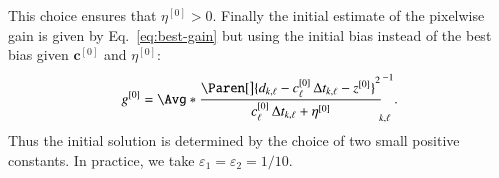 \documentclass{aa}
\newcommand*{\V}[1]{\boldsymbol{#1}}   %
\newcommand*{\Iter}[1]{^{[#1]}}
\begin{document}
This choice ensures that $\eta\Iter0 > 0$.  Finally the initial estimate
of the
pixelwise gain is given by Eq.~\eqref{eq:best-gain} but using the initial bias
instead of the best bias given $\V c\Iter0$ and $\eta\Iter0$:
\begin{equation}
  g\Iter0 = \Avg*{
    \frac{
      \Paren[\big]{
        d_{k,\ell} -c\Iter0_{\ell}\,\Delta t_{k,\ell} - z\Iter0
      }^2
    }{
      c\Iter0_{\ell}\,\Delta t_{k,\ell} + \eta\Iter0
    }
  }_{\!\!k,\ell}^{-1}.
  \label{eq:initial-gain}
\end{equation}
Thus the initial solution is determined by the choice of two small positive
constants.  In practice, we take $\varepsilon_1 = \varepsilon_2 = 1/10$.




\end{document}
